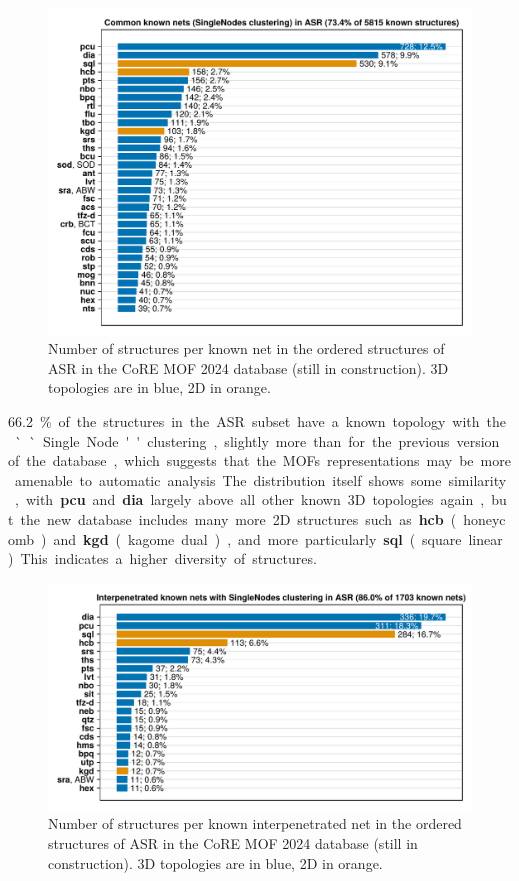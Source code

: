 \documentclass[main.tex]{subfiles}
\begin{document}
\begin{figure}
	\centering
	\includegraphics[width=\linewidth]{figures/topology/CoREMOF2024.pdf}
	\caption{Number of structures per known net in the ordered structures of ASR in the CoRE MOF 2024 database (still in construction). 3D topologies are in blue, 2D in orange.}\label{fig:CoREMOF2024}
\end{figure}

\qty{66.2}\% of the structures in the ASR subset have a known topology with the ``Single Node'' clustering, slightly more than for the previous version of the database, which suggests that the MOFs representations may be more amenable to automatic analysis. The distribution itself shows some similarity, with \textbf{pcu} and \textbf{dia} largely above all other known 3D topologies again, but the new database includes many more 2D structures such as \textbf{hcb} (honeycomb) and \textbf{kgd} (kagome dual), and more particularly \textbf{sql} (square linear). This indicates a higher diversity of structures.

\begin{figure}
	\centering
	\includegraphics[width=\linewidth]{figures/topology/CoREMOF2024_interpenetration.pdf}
	\caption{Number of structures per known interpenetrated net in the ordered structures of ASR in the CoRE MOF 2024 database (still in construction). 3D topologies are in blue, 2D in orange.}\label{fig:CoREMOF2024_interpenetration}
\end{figure}
\end{document}

